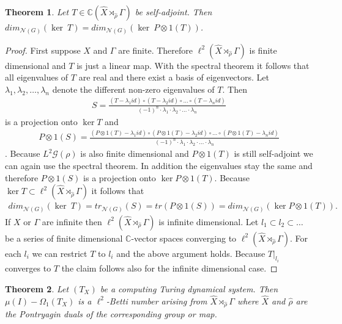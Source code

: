 \documentclass[12pt,a4paper]{scrartcl}
\newtheorem{Theorem}{Theorem}[section]
\numberwithin{equation}{section}
\newcommand{\C}{\mathbb{C}} %
\newcommand{\2}{\mathbb{Z} / 2 \mathbb{Z}}
\newcommand{\G}{\mathcal{G}}
\newcommand{\1}{\bar{1}}
\newcommand{\0}{\bar{0}}
\begin{document}
\begin{Theorem}
	Let $T \in \C(\hat{X} \rtimes_{\hat{\rho}} \Gamma)$ be self-adjoint. Then $dim_{\mathcal{N}(G)}(\ker \ T) = dim_{\mathcal{N}(G)}(\ker \ P \otimes 1(T))$.
\end{Theorem} \label{pontr}
\begin{proof}
	First suppose $X$ and $\Gamma$ are finite. Therefore $\ell^2(\hat{X} \rtimes_{\hat{\rho}} \Gamma)$ is finite dimensional and $T$ is just a linear map. With the spectral theorem it follows that all eigenvalues of $T$ are real and there exist a basis of eigenvectors. Let $\lambda_1, \lambda_2, \ldots, \lambda_n$ denote the different non-zero eigenvalues of $T$. Then
	\begin{align*}
		S = \frac{(T - \lambda_1 id) \circ (T - \lambda_2 id) \circ \ldots \circ (T - \lambda_n id)}{(-1)^n \cdot \lambda_1 \cdot \lambda_2 \cdot \ldots \cdot \lambda_n}
	\end{align*}
	is a projection onto $\ker T$ and 
	\begin{align*}
		P \otimes 1 (S) = \frac{(P \otimes 1(T) - \lambda_1 id) \circ (P \otimes 1(T) - \lambda_2 id) \circ \ldots \circ (P \otimes 1(T) - \lambda_n id)}{(-1)^n \cdot \lambda_1 \cdot \lambda_2 \cdot \ldots \cdot \lambda_n}
	\end{align*}.
	Because $L^2 \G (\rho)$ is also finite dimensional and $P \otimes 1(T)$ is still self-adjoint we can again use the spectral theorem. In addition the eigenvalues stay the same and therefore $P \otimes 1 (S)$ is a projection onto $\ker P \otimes 1 (T)$. Because $\ker T \subset \ell^2(\hat{X} \rtimes_{\hat{\rho}} \Gamma) $ it follows that
	\begin{align*}
		dim_{\mathcal{N}(G)}(\ker \ T) = tr_{\mathcal{N}(G)}(S) = tr(P \otimes 1 (S)) = dim_{\mathcal{N}(G)}(\ker P \otimes 1 (T)).
	\end{align*}
	If $X$ or $\Gamma$ are infinite then $\ell^2(\hat{X} \rtimes_{\hat{\rho}} \Gamma)$ is infinite dimensional. Let $l_1 \subset l_2 \subset \ldots$ be a series of finite dimensional $\C$-vector spaces converging to $\ell^2(\hat{X} \rtimes_{\hat{\rho}} \Gamma)$. For each $l_i$ we can restrict $T$ to $l_i$ and the above argument holds. Because $T|_{l_i}$ converges to $T$ the claim follows also for the infinite dimensional case.
\end{proof}
\begin{Theorem}
	Let $(T_X)$ be a computing Turing dynamical system. Then $\mu (I) - \Omega_1(T_X)$ is a $\ell^2$-Betti number arising from $\hat{X} \rtimes_{\hat{\rho}} \Gamma$ where $\hat{X}$ and $\hat{\rho}$ are the Pontryagin duals of the corresponding group or map.
\end{Theorem}
\end{document}
